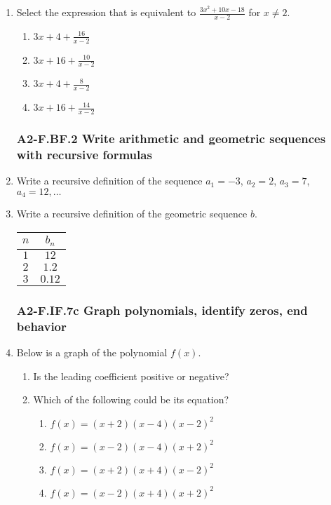 \documentclass[12pt, twoside]{article}
\begin{document}
\begin{enumerate}[itemsep=0.5cm]
\item Select the expression that is equivalent to $\displaystyle \frac{3x^2 + 10x - 18}{x - 2}$ for $x \neq 2$.
    \begin{enumerate}
        \item $\displaystyle 3x + 4 + \frac{16}{x - 2}$
        \item $\displaystyle 3x + 16 + \frac{10}{x - 2}$
        \item $\displaystyle 3x + 4 + \frac{8}{x - 2}$
        \item $\displaystyle 3x + 16 + \frac{14}{x - 2}$
    \end{enumerate}
    \vspace{3cm}

\newpage
\subsubsection*{A2-F.BF.2 Write arithmetic and geometric sequences with recursive formulas}
\item Write a recursive definition of the sequence $a_1 = -3$, $a_2 = 2$, $a_3 = 7$, $a_4 = 12, \ldots$ \vspace{2cm}

\item Write a recursive definition of the geometric sequence $b$. \\[0.5cm]
\renewcommand{\arraystretch}{1.5}
\begin{tabular}{|c|c|}
\hline
$n$ & $b_n$ \\
\hline
$1$ & $12$ \\
$2$ & $1.2$ \\
$3$ & $0.12$ \\
\hline
\end{tabular} \vspace{1cm}

\newpage 
\subsubsection*{A2-F.IF.7c Graph polynomials, identify zeros, end behavior}
\item Below is a graph of the polynomial $f(x)$. 
\begin{multicols}{2}
    \begin{enumerate}[itemsep=1cm]
        \item Is the leading coefficient positive or negative?
        \item Which of the following could be its equation?
    \begin{enumerate}
        \item $f(x)=(x+2)(x-4)(x-2)^2$
        \item $f(x)=(x-2)(x-4)(x+2)^2$
        \item $f(x)=(x+2)(x+4)(x-2)^2$
        \item $f(x)=(x-2)(x+4)(x+2)^2$
    \end{enumerate} \vspace{1cm} \;
    \end{enumerate}


\end{multicols}
\end{enumerate}
\end{document}
